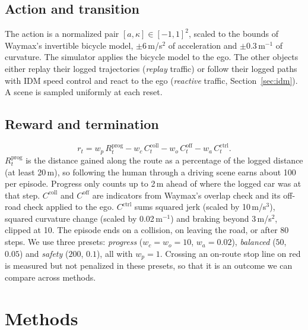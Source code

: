 \documentclass[conference]{IEEEtran}
\begin{document}
\subsection{Action and transition}
The action is a normalized pair $[a,\kappa]\in[-1,1]^2$, scaled to the bounds of Waymax's
invertible bicycle model, $\pm 6$\,m/s$^2$ of acceleration and $\pm 0.3$\,m$^{-1}$ of
curvature. The simulator applies the bicycle model to the ego. The other objects either
replay their logged trajectories (\emph{replay} traffic) or follow their logged paths
with IDM speed control and react to the ego (\emph{reactive} traffic,
Section~\ref{sec:idm}). A scene is sampled uniformly at each reset.

\subsection{Reward and termination}
\begin{equation}
r_t = w_p\,R^{\text{prog}}_t - w_c\,C^{\text{coll}}_t - w_o\,C^{\text{off}}_t - w_a\,C^{\text{ctrl}}_t .
\end{equation}
$R^{\text{prog}}_t$ is the distance gained along the route as a percentage of the logged
distance (at least 20\,m), so following the human through a driving scene earns about
100 per episode. Progress only counts up to 2\,m ahead of where the logged car was at
that step. $C^{\text{coll}}$ and $C^{\text{off}}$ are indicators from Waymax's overlap
check and its off-road check applied to the ego. $C^{\text{ctrl}}$ sums squared jerk
(scaled by 10\,m/s$^3$), squared curvature change (scaled by 0.02\,m$^{-1}$) and braking
beyond 3\,m/s$^2$, clipped at 10. The episode ends on a collision, on leaving the road, or
after 80 steps. We use three presets: \emph{progress} ($w_c=w_o=10$, $w_a=0.02$),
\emph{balanced} ($50$, $0.05$) and \emph{safety} ($200$, $0.1$), all with $w_p=1$.
Crossing an on-route stop line on red is measured but not penalized in these presets, so
that it is an outcome we can compare across methods.

\section{Methods}
\end{document}
